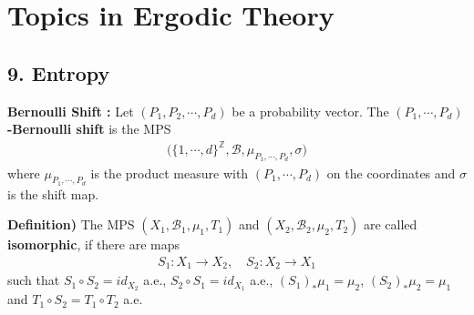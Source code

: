 \documentclass[10pt,a4paper]{report}
\DeclarePairedDelimiter\bignorm{\lVert}{\rVert}
\begin{document}
\newcommand{\thm}{\textbf{Theorem) }}
\newcommand{\thmnum}[1]{\textbf{Theorem #1) }}
\newcommand{\defi}{\textbf{Definition) }}
\newcommand{\lem}{\textbf{Lemma) }}
\newcommand{\lemnum}[1]{\textbf{Lemma #1) }}
\newcommand{\prop}{\textbf{Proposition) }}
\newcommand{\pf}{\textbf{proof) }}
\newcommand{\cor}{\textbf{Corollary) }}
\newcommand{\cornum}[1]{\textbf{Corollary #1) }}

\newcommand{\lap}{\triangle} %
\newcommand{\s}{\vspace{10pt}}
\newcommand{\bull}{$\bullet$}
\newcommand{\sta}{$\star$}
\newcommand{\reals}{\mathbb{R}}

\newcommand{\eop}{\hfill  \textsl{(End of proof)} $\square$} %

\newcommand{\intN}{\mathbb{Z}_N}
\newcommand{\norms}[2]{\bignorm[\big]{#1}_{#2}}
\newcommand{\abs}[1]{\big| #1 \big|}
\newcommand{\avg}{\mathbb{E}}
\newcommand{\borel}{\mathscr{B}}
\newcommand{\setlimsup}[2]{\bigcap_{#1=1}^{\infty}\bigcup_{#2=#1}^{\infty}}
\newcommand{\dlim}{D\text{-}\lim}
\newcommand{\clim}{C\text{-}\lim}

\newcommand{\newday}{======================================================================}
\newcommand{\digression}{**********************************************************************************************}

\setlength\parindent{0pt}
\noindent

\chapter*{Topics in Ergodic Theory}
\s

\section*{9. Entropy}

\textbf{Bernoulli Shift : } Let $(P_1, P_2,\cdots, P_d)$ be a probability vector. The \textbf{$(P_1, \cdots, P_d)$-Bernoulli shift} is the MPS
\begin{align*}
\big( \{1,\cdots, d\}^{\mathbb{Z}}, \borel, \mu_{P_1,\cdots, P_d},\sigma \big)
\end{align*}
where $\mu_{P_1,\cdots, P_d}$ is the product measure with $(P_1,\cdots, P_d)$ on the coordinates and $\sigma$ is the shift map.
\s

\defi The MPS $(X_1, \borel_1, \mu_1, T_1)$ and $(X_2,\borel_2, \mu_2, T_2)$ are called \textbf{isomorphic}, if there are maps
\begin{align*}
S_1 : X_1\rightarrow X_2,\quad S_2 : X_2 \rightarrow X_1
\end{align*}
such that $S_1 \circ S_2 = id_{X_2}$ a.e., $S_2 \circ S_1 = id_{X_1}$ a.e., $(S_1)_* \mu_1 =\mu_2$, $(S_2)_* \mu_2 =\mu_1$ and $T_1 \circ S_2 = T_1 \circ T_2$ a.e.
\s
\end{document}
